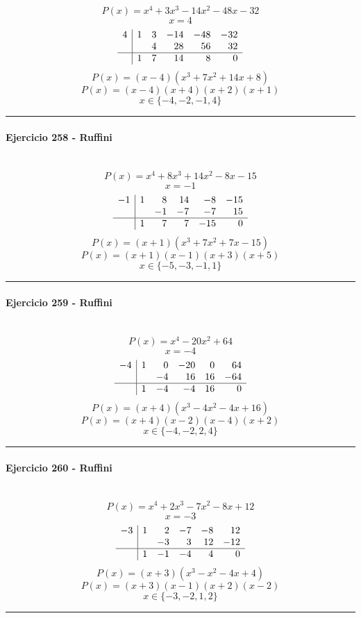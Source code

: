\documentclass[10pt,a4paper]{article}
\newcommand{\res}[1]{\paragraph{#1}\mbox{}\\[-1.2em]}
\begin{document}
\[ P(x)=x^{4} + 3 x^{3} - 14 x^{2} - 48 x - 32 \]
\[ x=4 \]
\[\begin{array}{r|rrrrr}4 & 1 & 3 & -14 & -48 & -32\\  &  & 4 & 28 & 56 & 32\\\hline  & 1 & 7 & 14 & 8 & 0\end{array}\]
\[ P(x)=(x-4)(x^{3} + 7 x^{2} + 14 x + 8) \]
\[ P(x)=(x-4)(x+4)(x+2)(x+1) \]
\[ \boxed{x\in\{-4,-2,-1,4\}} \]
\vspace{1mm}\hrule\vspace{2mm}
\res{Ejercicio 258 - Ruffini}
\[ P(x)=x^{4} + 8 x^{3} + 14 x^{2} - 8 x - 15 \]
\[ x=-1 \]
\[\begin{array}{r|rrrrr}-1 & 1 & 8 & 14 & -8 & -15\\  &  & -1 & -7 & -7 & 15\\\hline  & 1 & 7 & 7 & -15 & 0\end{array}\]
\[ P(x)=(x+1)(x^{3} + 7 x^{2} + 7 x - 15) \]
\[ P(x)=(x+1)(x-1)(x+3)(x+5) \]
\[ \boxed{x\in\{-5,-3,-1,1\}} \]
\vspace{1mm}\hrule\vspace{2mm}
\res{Ejercicio 259 - Ruffini}
\[ P(x)=x^{4} - 20 x^{2} + 64 \]
\[ x=-4 \]
\[\begin{array}{r|rrrrr}-4 & 1 & 0 & -20 & 0 & 64\\  &  & -4 & 16 & 16 & -64\\\hline  & 1 & -4 & -4 & 16 & 0\end{array}\]
\[ P(x)=(x+4)(x^{3} - 4 x^{2} - 4 x + 16) \]
\[ P(x)=(x+4)(x-2)(x-4)(x+2) \]
\[ \boxed{x\in\{-4,-2,2,4\}} \]
\vspace{1mm}\hrule\vspace{2mm}
\res{Ejercicio 260 - Ruffini}
\[ P(x)=x^{4} + 2 x^{3} - 7 x^{2} - 8 x + 12 \]
\[ x=-3 \]
\[\begin{array}{r|rrrrr}-3 & 1 & 2 & -7 & -8 & 12\\  &  & -3 & 3 & 12 & -12\\\hline  & 1 & -1 & -4 & 4 & 0\end{array}\]
\[ P(x)=(x+3)(x^{3} - x^{2} - 4 x + 4) \]
\[ P(x)=(x+3)(x-1)(x+2)(x-2) \]
\[ \boxed{x\in\{-3,-2,1,2\}} \]
\vspace{1mm}\hrule\vspace{2mm}
\end{document}
